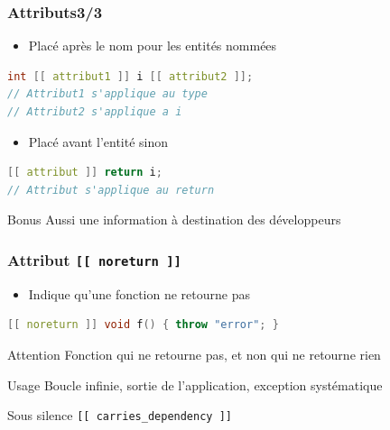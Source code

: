 \documentclass[C++.tex]{subfiles}
\begin{document}
\begin{frame}[fragile]
	\frametitle{Attributs\titlehfill{}3/3}
	\begin{itemize}
		\item Placé après le nom pour les entités nommées
	\end{itemize}

	\begin{lstlisting}[language=C++]
int [[ attribut1 ]] i [[ attribut2 ]];
// Attribut1 s'applique au type
// Attribut2 s'applique a i\end{lstlisting}

	\begin{itemize}
		\item Placé avant l'entité sinon
	\end{itemize}

	\begin{lstlisting}[language=C++]
[[ attribut ]] return i;
// Attribut s'applique au return\end{lstlisting}

	\begin{exampleblock}{Bonus}
		Aussi une information à destination des développeurs
	\end{exampleblock}
\end{frame}

\begin{frame}[fragile]
	\frametitle{Attribut \lstinline|[[ noreturn ]]|}
	\begin{itemize}
		\item Indique qu'une fonction ne retourne pas
	\end{itemize}

	\begin{lstlisting}[language=C++]
[[ noreturn ]] void f() { throw "error"; }\end{lstlisting}

	\begin{alertblock}{Attention}
		Fonction qui ne retourne pas, et non qui ne retourne rien
	\end{alertblock}

	\begin{block}{Usage}
		Boucle infinie, sortie de l'application, exception systématique
	\end{block}

	\begin{block}{Sous silence}
		\lstinline|[[ carries_dependency ]]|
	\end{block}
\end{frame}
\end{document}
